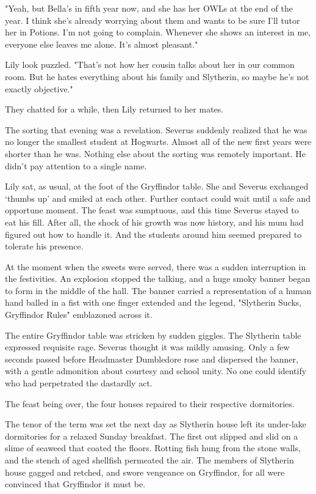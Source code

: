 "Yeah, but Bella's in fifth year now, and she has her OWLs at the end of the year. I think she's already worrying about them and wants to be sure I'll tutor her in Potions. I'm not going to complain. Whenever she shows an interest in me, everyone else leaves me alone. It's almost pleasant."

Lily look puzzled. "That's not how her cousin talks about her in our common room. But he hates everything about his family and Slytherin, so maybe he's not exactly objective."

They chatted for a while, then Lily returned to her mates.

The sorting that evening was a revelation. Severus suddenly realized that he was no longer the smallest student at Hogwarts. Almost all of the new first years were shorter than he was. Nothing else about the sorting was remotely important. He didn't pay attention to a single name.

Lily sat, as usual, at the foot of the Gryffindor table. She and Severus exchanged `thumbs up' and smiled at each other. Further contact could wait until a safe and opportune moment. The feast was sumptuous, and this time Severus stayed to eat his fill. After all, the shock of his growth was now history, and his mum had figured out how to handle it. And the students around him seemed prepared to tolerate his presence.

At the moment when the sweets were served, there was a sudden interruption in the festivities. An explosion stopped the talking, and a huge smoky banner began to form in the middle of the hall. The banner carried a representation of a human hand balled in a fist with one finger extended and the legend, "Slytherin Sucks, Gryffindor Rules" emblazoned across it.

The entire Gryffindor table was stricken by sudden giggles. The Slytherin table expressed requisite rage. Severus thought it was mildly amusing. Only a few seconds passed before Headmaster Dumbledore rose and dispersed the banner, with a gentle admonition about courtesy and school unity. No one could identify who had perpetrated the dastardly act.

The feast being over, the four houses repaired to their respective dormitories.

The tenor of the term was set the next day as Slytherin house left its under-lake dormitories for a relaxed Sunday breakfast. The first out slipped and slid on a slime of seaweed that coated the floors. Rotting fish hung from the stone walls, and the stench of aged shellfish permeated the air. The members of Slytherin house gagged and retched, and swore vengeance on Gryffindor, for all were convinced that Gryffindor it must be.

